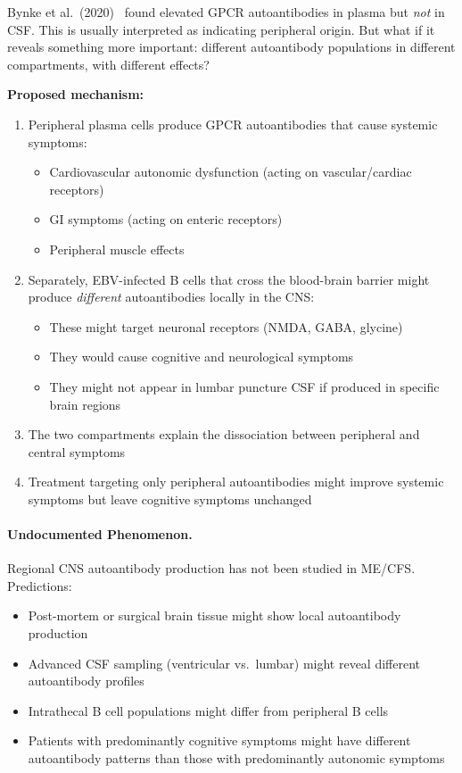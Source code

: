 \begin{open_question}
Bynke et al.\ (2020)~\cite{Bynke2020} found elevated GPCR autoantibodies in plasma but \textit{not} in CSF. This is usually interpreted as indicating peripheral origin. But what if it reveals something more important: different autoantibody populations in different compartments, with different effects?

\textbf{Proposed mechanism:}
\begin{enumerate}
    \item Peripheral plasma cells produce GPCR autoantibodies that cause systemic symptoms:
    \begin{itemize}
        \item Cardiovascular autonomic dysfunction (acting on vascular/cardiac receptors)
        \item GI symptoms (acting on enteric receptors)
        \item Peripheral muscle effects
    \end{itemize}
    \item Separately, EBV-infected B cells that cross the blood-brain barrier might produce \textit{different} autoantibodies locally in the CNS:
    \begin{itemize}
        \item These might target neuronal receptors (NMDA, GABA, glycine)
        \item They would cause cognitive and neurological symptoms
        \item They might not appear in lumbar puncture CSF if produced in specific brain regions
    \end{itemize}
    \item The two compartments explain the dissociation between peripheral and central symptoms
    \item Treatment targeting only peripheral autoantibodies might improve systemic symptoms but leave cognitive symptoms unchanged
\end{enumerate}
\end{open_question}

\paragraph{Undocumented Phenomenon.} Regional CNS autoantibody production has not been studied in ME/CFS. Predictions:
\begin{itemize}
    \item Post-mortem or surgical brain tissue might show local autoantibody production
    \item Advanced CSF sampling (ventricular vs.\ lumbar) might reveal different autoantibody profiles
    \item Intrathecal B cell populations might differ from peripheral B cells
    \item Patients with predominantly cognitive symptoms might have different autoantibody patterns than those with predominantly autonomic symptoms
\end{itemize}

